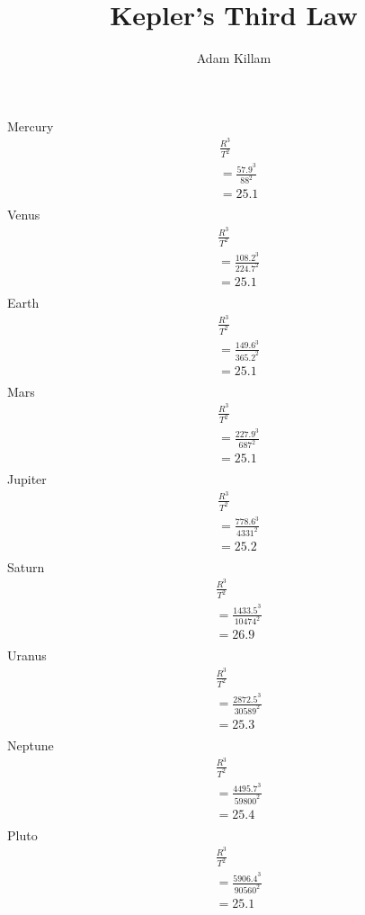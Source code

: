 \documentclass{article}
\title{Kepler's Third Law}
\author{Adam Killam}
\begin{document}
\maketitle
\noindent
Mercury
\begin{align*}
&\frac{R^3}{T^2}\\
&=\frac{57.9^3}{88^2}\\
&=25.1\\
\end{align*}
Venus
\begin{align*}
&\frac{R^3}{T^2}\\
&=\frac{108.2^3}{224.7^2}\\
&=25.1\\
\end{align*}
Earth
\begin{align*}
&\frac{R^3}{T^2}\\
&=\frac{149.6^3}{365.2^2}\\
&=25.1\\
\end{align*}
Mars
\begin{align*}
&\frac{R^3}{T^2}\\
&=\frac{227.9^3}{687^2}\\
&=25.1\\
\end{align*}
Jupiter
\begin{align*}
&\frac{R^3}{T^2}\\
&=\frac{778.6^3}{4331^2}\\
&=25.2\\
\end{align*}
Saturn
\begin{align*}
&\frac{R^3}{T^2}\\
&=\frac{1433.5^3}{10474^2}\\
&=26.9\\
\end{align*}
Uranus
\begin{align*}
&\frac{R^3}{T^2}\\
&=\frac{2872.5^3}{30589^2}\\
&=25.3\\
\end{align*}
Neptune
\begin{align*}
&\frac{R^3}{T^2}\\
&=\frac{4495.7^3}{59800^2}\\
&=25.4\\
\end{align*}
Pluto
\begin{align*}
&\frac{R^3}{T^2}\\
&=\frac{5906.4^3}{90560^2}\\
&=25.1\\
\end{align*}
\end{document}
